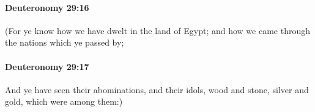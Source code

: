		\paragraph{Deuteronomy 29:16} %
			\label{DEUTERONOMY-29-16}

			(For ye know how we have dwelt in the land of Egypt; and how we came through the nations which ye passed by;


		\paragraph{Deuteronomy 29:17} %
			\label{DEUTERONOMY-29-17}

			And ye have seen their abominations, and their idols, wood and stone, silver and gold, which were among them:)



